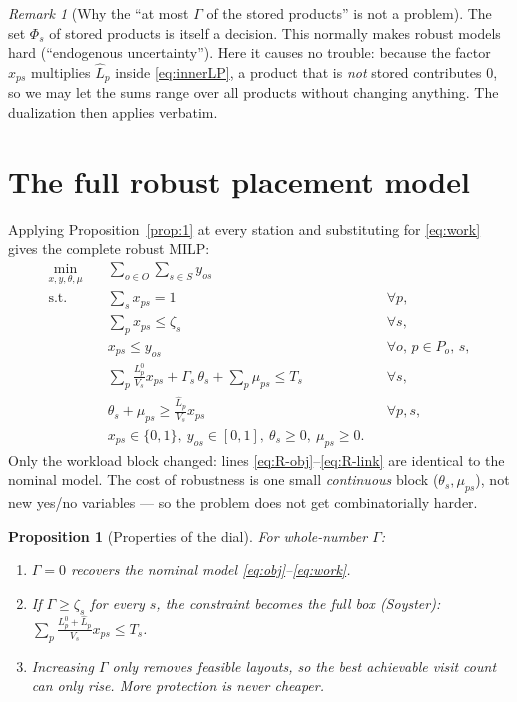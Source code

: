 \documentclass[11pt]{article}
\theoremstyle{definition}
\theoremstyle{plain}
\newtheorem{proposition}{Proposition}
\theoremstyle{remark}
\newtheorem{remark}{Remark}
\newcommand{\Lnom}{L^{0}}   %
\newcommand{\Lhat}{\hat{L}} %
\begin{document}
\begin{remark}[Why the ``at most $\Gamma$ of the stored products'' is not a problem]
The set $\Phi_s$ of stored products is itself a decision. This normally makes
robust models hard (``endogenous uncertainty''). Here it causes no trouble:
because the factor $x_{ps}$ multiplies $\Lhat_p$ inside \eqref{eq:innerLP}, a
product that is \emph{not} stored contributes $0$, so we may let the sums range
over all products without changing anything. The dualization then applies
verbatim.
\end{remark}

\section{The full robust placement model}

Applying Proposition~\ref{prop:1} at every station and substituting for
\eqref{eq:work} gives the complete robust MILP:
\begin{align}
\min_{x,y,\theta,\mu}\quad & \sum_{o\in O}\sum_{s\in S} y_{os} \label{eq:R-obj}\\
\text{s.t.}\quad
& \sum_{s} x_{ps}=1 && \forall p, \label{eq:R-assign}\\
& \sum_{p} x_{ps}\le \zeta_s && \forall s, \label{eq:R-slot}\\
& x_{ps}\le y_{os} && \forall o,\,p\in P_o,\,s, \label{eq:R-link}\\
& \sum_{p}\frac{\Lnom_p}{V_s}x_{ps} + \Gamma_s\,\theta_s + \sum_{p}\mu_{ps} \le T_s && \forall s, \label{eq:R-work}\\
& \theta_s + \mu_{ps} \ge \frac{\Lhat_p}{V_s}x_{ps} && \forall p,s, \label{eq:R-dual}\\
& x_{ps}\in\{0,1\},\ y_{os}\in[0,1],\ \theta_s\ge0,\ \mu_{ps}\ge0. \label{eq:R-dom}
\end{align}
Only the workload block changed: lines \eqref{eq:R-obj}--\eqref{eq:R-link} are
identical to the nominal model. The cost of robustness is one small
\emph{continuous} block ($\theta_s,\mu_{ps}$), not new yes/no variables --- so
the problem does not get combinatorially harder.

\begin{proposition}[Properties of the dial]\label{prop:2}
For whole-number $\Gamma$:
\begin{enumerate}[label=(\roman*),nosep]
  \item $\Gamma=0$ recovers the nominal model \eqref{eq:obj}--\eqref{eq:work}.
  \item If $\Gamma\ge\zeta_s$ for every $s$, the constraint becomes the full box
  (Soyster): $\sum_p \tfrac{\Lnom_p+\Lhat_p}{V_s}x_{ps}\le T_s$.
  \item Increasing $\Gamma$ only \emph{removes} feasible layouts, so the best
  achievable visit count can only rise. More protection is never cheaper.
\end{enumerate}
\end{proposition}
\end{document}
